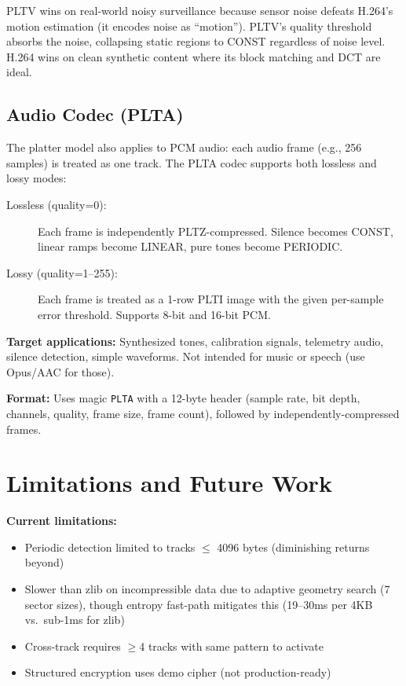 \documentclass[11pt,a4paper]{article}
\begin{document}
PLTV wins on real-world noisy surveillance because sensor noise defeats H.264's motion estimation (it encodes noise as ``motion''). PLTV's quality threshold absorbs the noise, collapsing static regions to CONST regardless of noise level. H.264 wins on clean synthetic content where its block matching and DCT are ideal.

\subsection{Audio Codec (PLTA)}

The platter model also applies to PCM audio: each audio frame (e.g., 256 samples) is treated as one track. The PLTA codec supports both lossless and lossy modes:

\begin{description}
\item[Lossless (quality=0):] Each frame is independently PLTZ-compressed. Silence becomes CONST, linear ramps become LINEAR, pure tones become PERIODIC.
\item[Lossy (quality=1--255):] Each frame is treated as a 1-row PLTI image with the given per-sample error threshold. Supports 8-bit and 16-bit PCM.
\end{description}

\textbf{Target applications:} Synthesized tones, calibration signals, telemetry audio, silence detection, simple waveforms. Not intended for music or speech (use Opus/AAC for those).

\textbf{Format:} Uses magic \texttt{PLTA} with a 12-byte header (sample rate, bit depth, channels, quality, frame size, frame count), followed by independently-compressed frames.

\section{Limitations and Future Work}

\textbf{Current limitations:}
\begin{itemize}
\item Periodic detection limited to tracks $\leq$ 4096 bytes (diminishing returns beyond)
\item Slower than zlib on incompressible data due to adaptive geometry search (7 sector sizes), though entropy fast-path mitigates this (19--30ms per 4KB vs.\ sub-1ms for zlib)
\item Cross-track requires $\geq$4 tracks with same pattern to activate
\item Structured encryption uses demo cipher (not production-ready)
\end{itemize}
\end{document}

